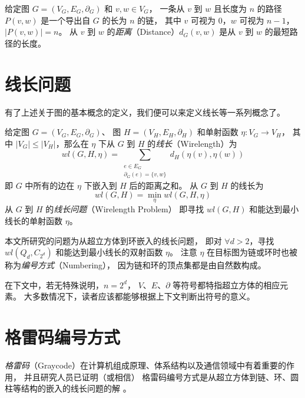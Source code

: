 给定图 $G = (V_G, E_G, \partial_G)$ 和 $v, w \in V_G$，
一条从 $v$ 到 $w$ 且长度为 $n$ 的路径 $P(v, w)$ 是一个导出自 $G$ 的长为 $n$ 的链，
其中 $v$ 可视为 $0$，$w$ 可视为 $n - 1$，$|P(v, w)| = n$。
从 $v$ 到 $w$ 的\emph{距离}（Distance）$d_G(v, w)$ 是从 $v$ 到 $w$ 的最短路径的长度。

\section{线长问题}
\label{Section 2.2}

有了上述关于图的基本概念的定义，我们便可以来定义线长等一系列概念了。

给定图 $G = (V_G, E_G, \partial_G)$、
图 $H = (V_H, E_H, \partial_H)$ 和单射函数 $\eta \colon V_G \rightarrow V_H$，
其中 $|V_G| \le |V_H|$，那么在 $\eta$ 下从 $G$ 到 $H$ 的\emph{线长}（Wirelength）为
\begin{equation*}
wl(G, H, \eta) = \sum_{\substack{
	e \in E_G \\
	\partial_G(e) = \{v, w\}
}} d_H(\eta(v), \eta(w))
\end{equation*}
即 $G$ 中所有的边在 $\eta$ 下嵌入到 $H$ 后的距离之和。
从 $G$ 到 $H$ 的线长为
\begin{equation*}
wl(G, H) = \min_{\eta} wl(G, H, \eta)
\end{equation*}
从 $G$ 到 $H$ 的\emph{线长问题}（Wirelength Problem）
即寻找 $wl(G, H)$ 和能达到最小线长的单射函数 $\eta$。

本文所研究的问题为从超立方体到环嵌入的线长问题，
即对 $\forall d > 2$，寻找 $wl(Q_d, C_{2^d})$ 和能达到最小线长的双射函数 $\eta$。
注意 $\eta$ 在目标图为链或环时也被称为\emph{编号方式}（Numbering），
因为链和环的顶点集都是由自然数构成。

在下文中，若无特殊说明，$n = 2^d$，
$V$、$E$、$\partial$ 等符号都特指超立方体的相应元素。
大多数情况下，读者应该都能够根据上下文判断出符号的意义。

\section{格雷码编号方式}
\label{Section 2.3}

\emph{格雷码}（Graycode）在计算机组成原理、体系结构以及通信领域中有着重要的作用，
并且研究人员已证明（或相信）
格雷码编号方式是从超立方体到链、环、圆柱等结构的嵌入的线长问题的解
\cite{Harper.1964,Guu.1997,Manuel.2011}。


